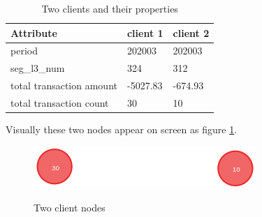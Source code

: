 \begin{center}
\begin{table}[htb!]
    \centering
    \begin{tabular}{lll}
    \toprule
                      Attribute &                              client 1 &                                client 2 \\
    \midrule
                         period &                                202003 &                                  202003 \\
                     seg\_l3\_num &                                   324 &                                     312 \\
         total transaction amount &                              -5027.83 &                                 -674.93 \\
          total transaction count &                                    30 &                                      10 \\
    \bottomrule
    \end{tabular}
    \caption{Two clients and their properties}
    \label{tab:twoclientproperties}
\end{table}
\end{center}

Visually these two nodes appear on screen as figure \ref{fig:twoclientnodes}.

\begin{figure}[ht]
\caption{Two client nodes}
\centering
\includegraphics[width=\textwidth]{png/graph_client12.png}
\label{fig:twoclientnodes}
\end{figure}

